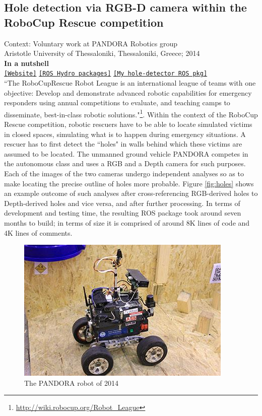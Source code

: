 \subsection{Hole detection via RGB-D camera within the RoboCup Rescue competition}

\noindent Context: Voluntary work at PANDORA Robotics group\\
\noindent Aristotle University of Thessaloniki, Thessaloniki, Greece; 2014\\

\noindent \textbf{In a nutshell}\\
\noindent \href{http://pandora.ee.auth.gr/}{\texttt{[Website]}} \href{https://github.com/pandora-auth-ros-pkg}{\texttt{[ROS Hydro packages]}} \href{https://github.com/li9i/pandora_vision_2014/tree/hydro-devel/pandora_vision_hole_detector}{\texttt{[My hole-detector ROS pkg]}}\\


``The RoboCupRescue Robot League is an international league of teams with one
objective: Develop and demonstrate advanced robotic capabilities for emergency
responders using annual competitions to evaluate, and teaching camps to
disseminate, best-in-class robotic
solutions."\footnote{\url{http://wiki.robocup.org/Robot_League}}. Within the
context of the RoboCup Rescue competition, robotic rescuers have to be able to
locate simulated victims in closed spaces, simulating what is to happen during
emergency situations. A rescuer has to first detect the ``holes" in walls
behind which these victims are assumed to be located. The unmanned ground
vehicle PANDORA competes in the autonomous class and uses a RGB and a Depth
camera for such purposes. Each of the images of the two cameras undergo
independent analyses so as to make locating the precise outline of holes more
probable. Figure \ref{fig:holes} shows an example outcome of such analyses
after cross-referencing RGB-derived holes to Depth-derived holes and vice
versa, and after further processing. In terms of development and testing time,
the resulting ROS package took around seven months to build; in terms of size
it is comprised of around 8K lines of code and 4K lines of comments.

\begin{figure}[H]\centering
  \includegraphics[scale=1.5]{images/pandora_robot.jpg}
  \caption{\small The PANDORA robot of 2014}
  \label{fig:pandora_robot}
\end{figure}

